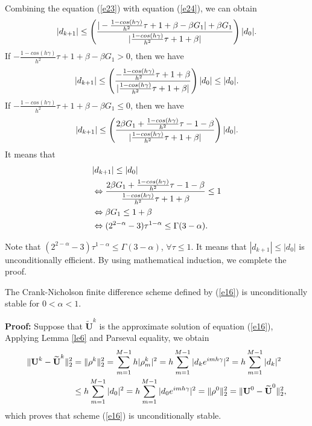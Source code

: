 \documentclass[3p,times]{elsarticle}
\begin{document}
Combining the equation (\ref{e23}) with equation (\ref{e24}), we can obtain
\begin{equation}\label{e25}
\aligned
\displaystyle|d_{k+1}|\leq\left(\frac{|-\frac{1-cos(h\gamma)}{h^2}\tau+1+\beta-\beta G_1|+\beta G_1}{|\frac{1-cos(h\gamma)}{h^2}\tau+1+\beta|}\right)|d_0|.
\endaligned
\end{equation}
If $-\frac{1-cos(h\gamma)}{h^2}\tau+1+\beta-\beta G_1>0$, then we have
\begin{equation}\label{e26}
\aligned
\displaystyle|d_{k+1}|\leq\left(\frac{-\frac{1-cos(h\gamma)}{h^2}\tau+1+\beta}{|\frac{1-cos(h\gamma)}{h^2}\tau+1+\beta|}\right)|d_0|\leq|d_0|.
\endaligned
\end{equation}
If $-\frac{1-cos(h\gamma)}{h^2}\tau+1+\beta-\beta G_1\leq0$, then we have
\begin{equation}\label{e27}
\aligned
\displaystyle|d_{k+1}|\leq\left(\frac{2\beta G_1+\frac{1-cos(h\gamma)}{h^2}\tau-1-\beta}{|\frac{1-cos(h\gamma)}{h^2}\tau+1+\beta|}\right)|d_0|.
\endaligned
\end{equation}
It means that
\begin{equation}\label{e28}
\aligned
&|d_{k+1}|\leq|d_0|\\
&\Leftrightarrow \frac{2\beta G_1+\frac{1-cos(h\gamma)}{h^2}\tau-1-\beta}{\frac{1-cos(h\gamma)}{h^2}\tau+1+\beta}\leq1\\
&\Leftrightarrow \beta G_1\leq 1+\beta\\
&\Leftrightarrow (2^{2-\alpha}-3)\tau^{1-\alpha}\leq\Gamma(3-\alpha).
\endaligned
\end{equation}

Note that  $(2^{2-\alpha}-3)\tau^{1-\alpha}\leq\Gamma(3-\alpha)$, $\forall\tau\leq1$. It means that $|d_{k+1}|\leq|d_0|$ is unconditionally efficient. By using mathematical induction, we complete the proof.
\begin{thm}\label{le7}
The Crank-Nicholson finite difference scheme defined by (\ref{e16}) is unconditionally stable for $0<\alpha<1$.
\end{thm}
\textbf{Proof:} Suppose that $\widetilde{\textbf{U}}^k$ is the approximate solution of equation (\ref{e16}), Applying Lemma \ref{le6} and Parseval equality, we obtain
\begin{equation}\label{e29}
\aligned
\|\textbf{U}^k-\widetilde{\textbf{U}}^k\|_2^2&=\|\rho^k\|_2^2=\sum\limits_{m=1}^{M-1}h|\rho^k_m|^2=h\sum\limits_{m=1}^{M-1}|d_ke^{imh\gamma}|^2=h\sum\limits_{m=1}^{M-1}|d_k|^2\\
&\leq h\sum\limits_{m=1}^{M-1}|d_0|^2=h\sum\limits_{m=1}^{M-1}|d_0e^{imh\gamma}|^2=\|\rho^0\|_2^2=\|\textbf{U}^0-\widetilde{\textbf{U}}^0\|_2^2,
\endaligned
\end{equation}
which proves that scheme (\ref{e16}) is unconditionally stable.
\end{document}
